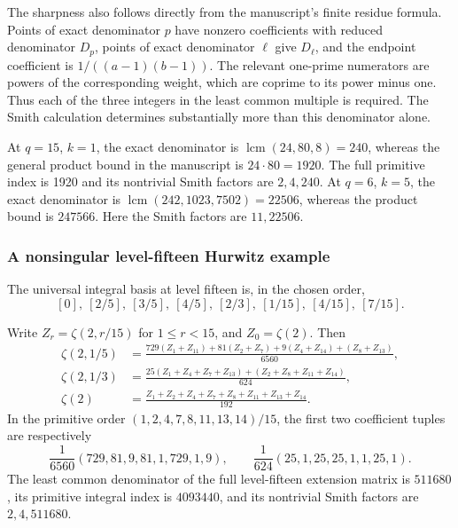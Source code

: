 The sharpness also follows directly from the manuscript's finite
residue formula. Points of exact denominator $p$ have nonzero
coefficients with reduced denominator $D_p$, points of exact
denominator $\ell$ give $D_\ell$, and the endpoint coefficient is
$1/((a-1)(b-1))$. The relevant one-prime numerators are powers of the
corresponding weight, which are coprime to its power minus one.
Thus each of the three integers in the least common multiple is
required. The Smith calculation determines substantially more than
this denominator alone.

At $q=15$, $k=1$, the exact denominator is
$\operatorname{lcm}(24,80,8)=240$, whereas the general product bound
in the manuscript is $24\cdot80=1920$. The full primitive index is
1920 and its nontrivial Smith factors are $2,4,240$.
At $q=6$, $k=5$, the exact denominator is
$\operatorname{lcm}(242,1023,7502)=22506$, whereas the product bound
is $247566$. Here the Smith factors are $11,22506$.

\subsubsection{A nonsingular level-fifteen Hurwitz example}

The universal integral basis at level fifteen is, in the chosen order,
\[
 [0],\ [2/5],\ [3/5],\ [4/5],\ [2/3],\ [1/15],\ [4/15],\ [7/15].
\]

\begin{corollary}
\label{intdist:cor:q15s2}
Write $Z_r=\zeta(2,r/15)$ for $1\le r<15$, and $Z_0=\zeta(2)$.
Then
\begin{align}
\zeta(2,1/5)
&=\frac{729(Z_1+Z_{11})+81(Z_2+Z_7)
                +9(Z_4+Z_{14})+(Z_8+Z_{13})}{6560},
\label{intdist:eq:q15-fifth}\\
\zeta(2,1/3)
&=\frac{25(Z_1+Z_4+Z_7+Z_{13})
                  +(Z_2+Z_8+Z_{11}+Z_{14})}{624},
\label{intdist:eq:q15-third}\\
\zeta(2)
&=\frac{Z_1+Z_2+Z_4+Z_7+Z_8+Z_{11}+Z_{13}+Z_{14}}{192}.
\label{intdist:eq:q15-endpoint}
\end{align}
In the primitive order $(1,2,4,7,8,11,13,14)/15$, the first two
coefficient tuples are respectively
\[
 \frac1{6560}(729,81,9,81,1,729,1,9),\qquad
 \frac1{624}(25,1,25,25,1,1,25,1).
\]
The least common denominator of the full level-fifteen extension
matrix is $511680$, its primitive integral index is $4093440$, and
its nontrivial Smith factors are $2,4,511680$.
\end{corollary}

